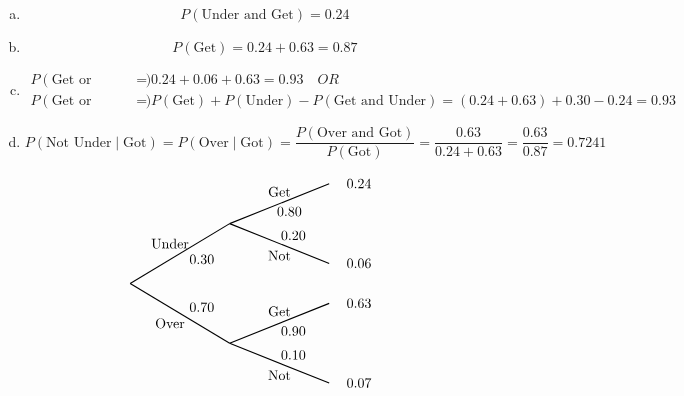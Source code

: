 \documentclass[11pt,letterpaper]{article}
\begin{document}
\sol
\begin{enumerate}[(a)]
\item 
	\[
	P(\text{Under and Get})= 0.24 
	\]

\item 
	\[
	P(\text{Get})= 0.24 + 0.63= 0.87
	\]

\item 
	\[
	\begin{aligned}
	P(\text{Get or Underbid})&= 0.24 + 0.06 + 0.63= 0.93 \quad \textit{OR} \\
	P(\text{Get or Underbid})&= P(\text{Get}) + P(\text{Under}) - P(\text{Get and Under})= (0.24 + 0.63) + 0.30 - 0.24= 0.93
	\end{aligned}
	\]

\item 
	\[
	P(\text{Not Under} \;|\; \text{Got})= P(\text{Over} \;|\; \text{Got})= \dfrac{P(\text{Over and Got})}{P(\text{Got})}= \dfrac{0.63}{0.24 + 0.63}= \dfrac{0.63}{0.87}= 0.7241
	\]
\end{enumerate}

		\[
		\begin{tikzpicture}[scale= 1.0]
		\def\FirstUpLabel{Under}
		\def\FirstDownLabel{Over}
		\def\SecondUpLabel{Get}
		\def\SecondDownLabel{Not}
		\def\Up{$0.30$}
		\def\Down{$0.70$}
		\def\UpUp{$0.80$}
		\def\UpDown{$0.20$}
		\def\DownUp{$0.90$}
		\def\DownDown{$0.10$}
		\def\first{$0.24$}
		\def\second{$0.06$}
		\def\third{$0.63$}
		\def\fourth{$0.07$}
		
		\node at (1,1) {\FirstUpLabel};	
		\node at (1,-1) {\FirstDownLabel};	
		\node at (1.8,0.6) {\Up};
		\node at (1.8,-0.6) {\Down};
		\draw[thick] (0,0) -- (2.5,1.5);
		\draw[thick] (0,0) -- (2.5,-1.5);
		
		\node at (3.75,2.3) {\SecondUpLabel};
		\node at (3.75,0.7) {\SecondDownLabel};
		\node at (4,1.8) {\UpUp};
		\node at (4.1,1.2) {\UpDown};
		\node at (5.75,2.5) {\first};
		\node at (5.75,0.5) {\second};
		\draw[thick] (2.5,1.5) -- (5,2.5);
		\draw[thick] (2.5,1.5) -- (5,0.5);

		\node at (3.75,-0.7) {\SecondUpLabel};
		\node at (3.75,-2.3) {\SecondDownLabel};
		\node at (4.1,-1.2) {\DownUp};
		\node at (4.1,-1.8) {\DownDown};
		\node at (5.75,-0.5) {\third};	
		\node at (5.75,-2.5) {\fourth};	
		\draw[thick] (2.5,-1.5) -- (5,-0.5);
		\draw[thick] (2.5,-1.5) -- (5,-2.5);
		\end{tikzpicture}
		\]





\newpage
\end{document}
